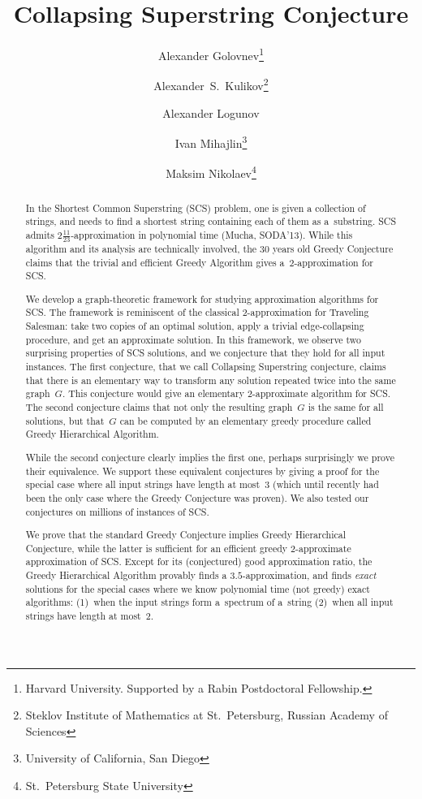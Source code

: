\documentclass[11pt]{article}
\begin{document}
\sloppy
\begin{titlepage}
\title{Collapsing Superstring Conjecture}
\author{
Alexander Golovnev\thanks{Harvard University. Supported by a Rabin Postdoctoral Fellowship.}
\and
Alexander~S.~Kulikov\thanks{Steklov Institute of Mathematics at St.~Petersburg, Russian Academy of Sciences}
\and
Alexander Logunov\footnotemark[2]
\and
Ivan Mihajlin\thanks{University of California, San Diego}
\and 
Maksim Nikolaev\thanks{St.~Petersburg State University}
}
\maketitle
\thispagestyle{empty}

\begin{abstract}
In the Shortest Common Superstring (SCS) problem, one is given a collection of strings, and needs to find a shortest string containing each of them as a~substring. SCS admits $2\frac{11}{23}$-approximation in polynomial time (Mucha, SODA'13). While this algorithm and its analysis are technically involved, the $30$ years old Greedy Conjecture claims that the trivial and efficient Greedy Algorithm gives a~$2$-approximation for SCS. 

We develop a graph-theoretic framework for studying approximation algorithms for SCS. The framework is reminiscent of the classical 2-approximation for Traveling Salesman: take two copies of an optimal solution, apply a trivial edge-collapsing procedure, and get an approximate solution. In this framework, we observe two surprising properties of SCS solutions, and we conjecture that they hold for all input instances. 
The first conjecture, that we call Collapsing Superstring conjecture, claims that there is an elementary way to transform any solution repeated twice into the same graph~$G$. This conjecture would give an elementary 2-approximate algorithm for SCS. The second conjecture claims that not only the resulting graph~$G$ is the same for all solutions, but that~$G$ can be computed by an elementary greedy procedure called Greedy Hierarchical Algorithm.

While the second conjecture clearly implies the first one, perhaps surprisingly we prove their equivalence. We support these equivalent conjectures by giving a proof for the special case where all input strings have length at most~$3$ (which until recently had been the only case where the Greedy Conjecture was proven). We also tested our conjectures on millions of instances of SCS.

We prove that the standard Greedy Conjecture implies Greedy Hierarchical Conjecture, while the latter is sufficient for an efficient greedy 2-approximate approximation of SCS. Except for its (conjectured) good approximation ratio, the Greedy Hierarchical Algorithm provably finds a $3.5$-approximation, and finds \emph{exact} solutions for the special cases where we know polynomial time (not greedy) exact algorithms: (1)~when the input strings form a~spectrum of a~string (2)~when all input strings have length at most~$2$.
\end{abstract}
\end{titlepage}











\appendix

\end{document}
